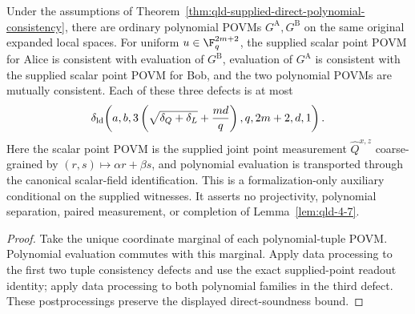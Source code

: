\begin{theorem}
\label{thm:qld-supplied-scalar-polynomial-consistency}
\leanok
{}
Under the assumptions of
Theorem~\ref{thm:qld-supplied-direct-polynomial-consistency}, there are ordinary
polynomial POVMs $G^{\mathrm A},G^{\mathrm B}$ on the same original expanded
local spaces. For uniform $u\in\F_q^{2m+2}$, the supplied scalar point POVM for
Alice is consistent with evaluation of $G^{\mathrm B}$, evaluation of
$G^{\mathrm A}$ is consistent with the supplied scalar point POVM for Bob, and
the two polynomial POVMs are mutually consistent. Each of these three defects
is at most
\[
 \delta_{\rm ld}\!\left(a,b,
  3\left(\sqrt{\delta_Q+\delta_L}+\frac{md}{q}\right),
  q,2m+2,d,1\right).
\]
Here the scalar point POVM is the supplied joint point measurement
$\hat Q^{x,z}$ coarse-grained by $(r,s)\mapsto\alpha r+\beta s$, and polynomial
evaluation is transported through the canonical scalar-field identification.
This is a formalization-only auxiliary conditional on the supplied witnesses.
It asserts no projectivity, polynomial separation, paired measurement, or
completion of Lemma~\ref{lem:qld-4-7}.
\end{theorem}
\begin{proof}
\leanok
{}
Take the unique coordinate marginal of each polynomial-tuple POVM. Polynomial
evaluation commutes with this marginal. Apply data processing to the first two
tuple consistency defects and use the exact supplied-point readout identity;
apply data processing to both polynomial families in the third defect. These
postprocessings preserve the displayed direct-soundness bound.
\end{proof}

